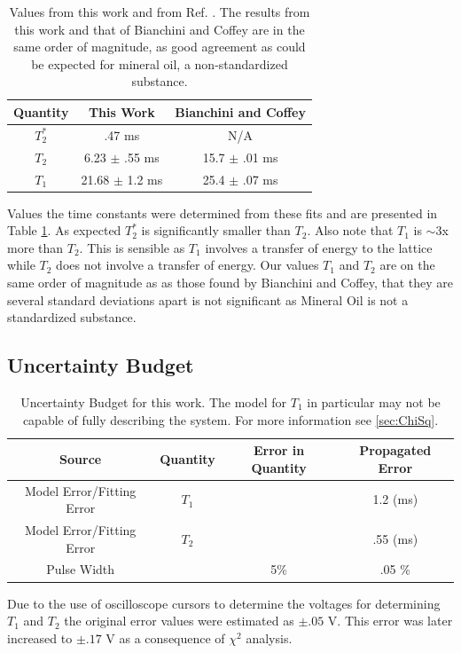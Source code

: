 \documentclass[11pt,letterpaper]{article}
\begin{document}
\begin{table}[!h]
\label{Result_Table}
\begin{center}
	\begin{tabular}{|c|c||c|}\hline
		Quantity & This Work & Bianchini and Coffey \\ \hline\hline
		$T_2^*$ & .47 ms &  N/A \\ \hline
		$T_2$ & 6.23 $\pm$ .55 ms &  15.7 $\pm$ .01 ms \\ \hline
		$T_1$ & 21.68 $\pm$ 1.2 ms &  25.4 $\pm$ .07 ms\\ \hline
	\end{tabular}
		\caption{Values from this work and from Ref. \cite{Bianchini}. The results from this work and that of Bianchini and Coffey are in the same order of magnitude, as good agreement as could be expected for mineral oil, a non-standardized substance.}
		\end{center}
	\end{table}
Values the time constants were determined from these fits and are presented in Table \ref{Result_Table}. As expected $T_2^*$ is significantly smaller than $T_2$. Also note that $T_1$ is $\sim$3x more than $T_2$. This is sensible as $T_1$ involves a transfer of energy to the lattice while $T_2$ does not involve a transfer of energy.
Our values $T_1$ and $T_2$ are on the same order of magnitude as as those found by Bianchini and Coffey, that they are several standard deviations apart is not significant as Mineral Oil is not a standardized substance.

\subsection{Uncertainty Budget}
\begin{table}[!h]
	\begin{center} 
		\begin{tabular}{|c|c|c|c|} \hline 
			Source & Quantity&  Error in Quantity  & Propagated Error  \\ \hline \hline
			Model Error/Fitting Error& $T_1$ &  & 1.2 (ms)\\ \hline
			Model Error/Fitting Error& $T_2$ & & .55 (ms)\\ \hline
			Pulse Width&  & 5\% & .05 \%\\
			\hline
		\end{tabular}
        \caption{Uncertainty Budget for this work. The model for $T_1$ in particular may not be capable of fully describing the system. For more information see \ref{sec:ChiSq}.}
	\end{center}
\end{table}
Due to the use of oscilloscope cursors to determine the voltages for determining $T_1$ and $T_2$ the original error values were estimated as $\pm .05$ V. This error was later increased to $\pm .17$ V as a consequence of $\chi^2$ analysis.
\end{document}
